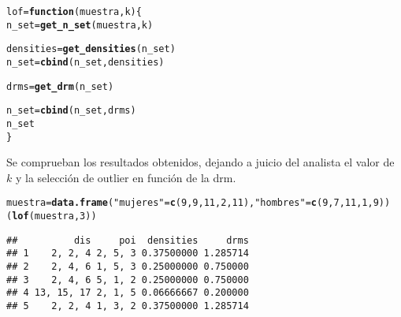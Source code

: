 \documentclass[12pt]{report}\usepackage[]{graphicx}\usepackage[dvipsnames]{xcolor}
\makeatletter
\newcommand{\hlnum}[1]{\textcolor[rgb]{0.686,0.059,0.569}{#1}}%
\newcommand{\hlstr}[1]{\textcolor[rgb]{0.192,0.494,0.8}{#1}}%
\newcommand{\hlstd}[1]{\textcolor[rgb]{0.345,0.345,0.345}{#1}}%
\newcommand{\hlkwa}[1]{\textcolor[rgb]{0.161,0.373,0.58}{\textbf{#1}}}%
\newcommand{\hlkwb}[1]{\textcolor[rgb]{0.69,0.353,0.396}{#1}}%
\newcommand{\hlkwc}[1]{\textcolor[rgb]{0.333,0.667,0.333}{#1}}%
\newcommand{\hlkwd}[1]{\textcolor[rgb]{0.737,0.353,0.396}{\textbf{#1}}}%
\newenvironment{kframe}{%
 \def\at@end@of@kframe{}%
 \ifinner\ifhmode%
  \def\at@end@of@kframe{\end{minipage}}%
  \begin{minipage}{\columnwidth}%
 \fi\fi%
 \def\FrameCommand##1{\hskip\@totalleftmargin \hskip-\fboxsep
 \colorbox{shadecolor}{##1}\hskip-\fboxsep
     \hskip-\linewidth \hskip-\@totalleftmargin \hskip\columnwidth}%
 \MakeFramed {\advance\hsize-\width
   \@totalleftmargin\z@ \linewidth\hsize
   \@setminipage}}%
 {\par\unskip\endMakeFramed%
 \at@end@of@kframe}
\newenvironment{knitrout}{}{} %
\makeatother
\begin{document}
\begin{knitrout}
\color{fgcolor}\begin{kframe}
\begin{alltt}
\hlstd{lof} \hlkwb{=} \hlkwa{function}\hlstd{(}\hlkwc{muestra}\hlstd{,} \hlkwc{k}\hlstd{) \{}
        \hlstd{n_set} \hlkwb{=} \hlkwd{get_n_set}\hlstd{(muestra, k)}

        \hlstd{densities} \hlkwb{=} \hlkwd{get_densities}\hlstd{(n_set)}
        \hlstd{n_set} \hlkwb{=} \hlkwd{cbind}\hlstd{(n_set, densities)}

        \hlstd{drms} \hlkwb{=} \hlkwd{get_drm}\hlstd{(n_set)}

        \hlstd{n_set} \hlkwb{=} \hlkwd{cbind}\hlstd{(n_set, drms)}
        \hlstd{n_set}
\hlstd{\}}
\end{alltt}
\end{kframe}
\end{knitrout}
					
					Se comprueban los resultados obtenidos, dejando a juicio del analista el valor de $k$ y la selección de outlier en función de la drm. 
					
\begin{knitrout}
\color{fgcolor}\begin{kframe}
\begin{alltt}
\hlstd{muestra} \hlkwb{=} \hlkwd{data.frame}\hlstd{(}\hlstr{"mujeres"} \hlstd{=} \hlkwd{c}\hlstd{(}\hlnum{9}\hlstd{,}\hlnum{9}\hlstd{,}\hlnum{11}\hlstd{,}\hlnum{2}\hlstd{,}\hlnum{11}\hlstd{),} \hlstr{"hombres"} \hlstd{=} \hlkwd{c}\hlstd{(}\hlnum{9}\hlstd{,}\hlnum{7}\hlstd{,}\hlnum{11}\hlstd{,}\hlnum{1}\hlstd{,}\hlnum{9}\hlstd{))}
\hlstd{(}\hlkwd{lof}\hlstd{(muestra,} \hlnum{3}\hlstd{))}
\end{alltt}
\begin{verbatim}
##          dis     poi  densities     drms
## 1    2, 2, 4 2, 5, 3 0.37500000 1.285714
## 2    2, 4, 6 1, 5, 3 0.25000000 0.750000
## 3    2, 4, 6 5, 1, 2 0.25000000 0.750000
## 4 13, 15, 17 2, 1, 5 0.06666667 0.200000
## 5    2, 2, 4 1, 3, 2 0.37500000 1.285714
\end{verbatim}
\end{kframe}
\end{knitrout}
	
\end{document}
